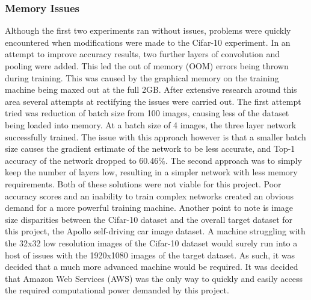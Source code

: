\documentclass[12pt]{report}
\begin{document}
\subsubsection{Memory Issues}
\begin{flushleft}
Although the first two experiments ran without issues, problems were quickly encountered when modifications were made to the Cifar-10 experiment. In an attempt to improve accuracy results, two further layers of convolution and pooling were added. This led the out of memory (OOM) errors being thrown during training. This was caused by the graphical memory on the training machine being maxed out at the full 2GB. After extensive research around this area several attempts at rectifying the issues were carried out. The first attempt tried was reduction of batch size from 100 images, causing less of the dataset being loaded into memory. At a batch size of 4 images, the three layer network successfully trained. The issue with this approach however is that a smaller batch size causes the gradient estimate of the network to be less accurate, and Top-1 accuracy of the network dropped to 60.46\%. The second approach was to simply keep the number of layers low, resulting in a simpler network with less memory requirements. Both of these solutions were not viable for this project. Poor accuracy scores and an inability to train complex networks created an obvious demand for a more powerful training machine. Another point to note is image size disparities between the Cifar-10 dataset and the overall target dataset for this project, the Apollo self-driving car image dataset. A machine struggling with the 32x32 low resolution images of the Cifar-10 dataset would surely run into a host of issues with the 1920x1080 images of the target dataset. As such, it was decided that a much more advanced machine would be required. It was decided that Amazon Web Services (AWS) was the only way to quickly and easily access the required computational power demanded by this project.
\end{flushleft}
\end{document}
